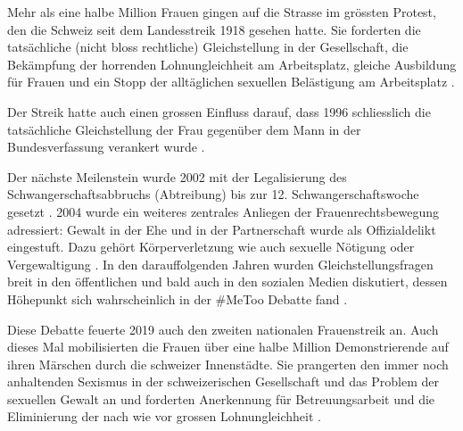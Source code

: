 Mehr als eine halbe Million Frauen gingen auf die Strasse im grössten Protest, den die Schweiz
seit dem Landesstreik 1918 gesehen hatte. Sie forderten die tatsächliche (nicht bloss rechtliche) Gleichstellung in der Gesellschaft,
die Bekämpfung der horrenden Lohnungleichheit am Arbeitsplatz, gleiche Ausbildung für Frauen
und ein Stopp der alltäglichen sexuellen Belästigung am Arbeitsplatz
\cite{frauensteik}.

Der Streik hatte auch einen grossen Einfluss darauf, dass 1996 schliesslich
die tatsächliche Gleichstellung der Frau gegenüber dem Mann in der Bundesverfassung
verankert wurde
\cite{gleichstellungsgesetz}.

Der nächste Meilenstein wurde 2002 mit der Legalisierung des Schwangerschaftsabbruchs (Abtreibung)
bis zur 12. Schwangerschaftswoche gesetzt
\cite{schwangerschaftsabbruch}.
2004 wurde ein weiteres zentrales Anliegen der Frauenrechtsbewegung adressiert: Gewalt
in der Ehe und in der Partnerschaft wurde als Offizialdelikt eingestuft. Dazu gehört Körperverletzung
wie auch sexuelle Nötigung oder Vergewaltigung
\cite{gewalt_frauen}.
In den darauffolgenden Jahren wurden Gleichstellungsfragen breit in den öffentlichen und
bald auch in den sozialen Medien diskutiert, dessen Höhepunkt sich wahrscheinlich in der
\#MeToo Debatte fand
\cite{metoo}.

Diese Debatte feuerte 2019 auch den zweiten nationalen Frauenstreik an. Auch dieses Mal mobilisierten
die Frauen über eine halbe Million Demonstrierende auf ihren Märschen durch die schweizer Innenstädte.
Sie prangerten den immer noch anhaltenden Sexismus in der schweizerischen Gesellschaft und
das Problem der sexuellen Gewalt an und forderten Anerkennung für Betreuungsarbeit und die Eliminierung
der nach wie vor grossen Lohnungleichheit
\cite{wiki_frauensteik}.

